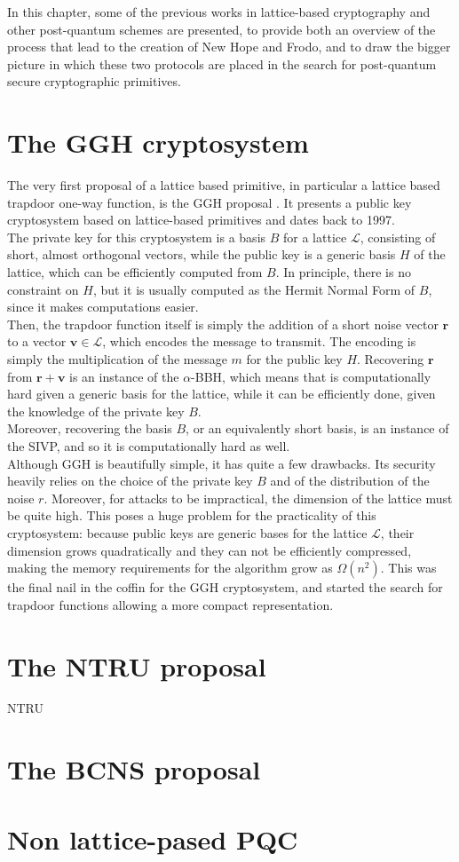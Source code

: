 In this chapter, some of the previous works in lattice-based cryptography and other post-quantum schemes are presented, to provide both an overview of the process that lead to the creation of New Hope and Frodo, and to draw the bigger picture in which these two protocols are placed in the search for post-quantum secure cryptographic primitives.

\section{The GGH cryptosystem}
The very first proposal of a lattice based primitive, in particular a lattice based trapdoor one-way function, is the GGH proposal \cite{GGH}. It presents a public key cryptosystem based on lattice-based primitives and dates back to 1997.\\
The private key for this cryptosystem is a basis $B$ for a lattice $\mathscr{L}$, consisting of short, almost orthogonal vectors, while the public key is a generic basis $H$ of the lattice, which can be efficiently computed from $B$. In principle, there is no constraint on $H$, but it is usually computed as the Hermit Normal Form of $B$, since it makes computations easier.\\
Then, the trapdoor function itself is simply the addition of a short noise vector $\mathbf{r}$ to a vector $\mathbf{v}\in\mathscr{L}$, which encodes the message to transmit. The encoding is simply the multiplication of the message $m$ for the public key $H$. Recovering $\mathbf{r}$ from $\mathbf{r}+\mathbf{v}$ is an instance of the $\alpha$-BBH, which means that is computationally hard given a generic basis for the lattice, while it can be efficiently done, given the knowledge of the private key $B$.\\
Moreover, recovering the basis $B$, or an equivalently short basis, is an instance of the SIVP, and so it is computationally hard as well.\\
Although GGH is beautifully simple, it has quite a few drawbacks. Its security heavily relies on the choice of the private key $B$ and of the distribution of the noise $r$. Moreover, for attacks to be impractical, the dimension of the lattice must be quite high. This poses a huge problem for the practicality of this cryptosystem: because public keys are generic bases for the lattice $\mathscr{L}$, their dimension grows quadratically and they can not be efficiently compressed, making the memory requirements for the algorithm grow as $\Omega(n^2)$. This was the final nail in the coffin for the GGH cryptosystem, and started the search for trapdoor functions allowing a more compact representation.

\section{The NTRU proposal}
NTRU 

\section{The BCNS proposal}

\section{Non lattice-pased PQC}
